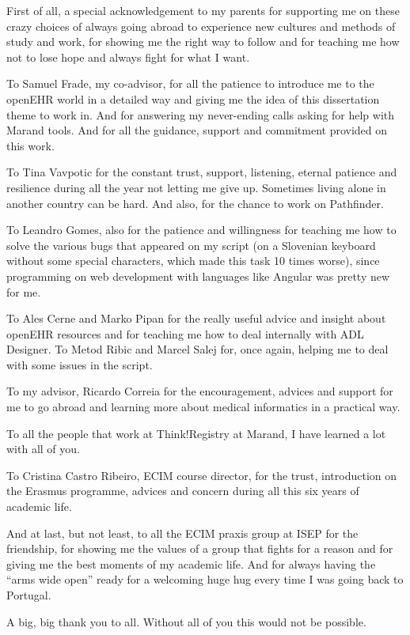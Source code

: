 \documentclass[mim_thesis.tex]{subfiles}
\begin{document}
First of all, a special acknowledgement to my parents for supporting me on these crazy choices of always going abroad to experience new cultures and methods of study and work, for showing me the right way to follow and for teaching me how not to lose hope and always fight for what I want.

To Samuel Frade, my co-advisor, for all the patience to introduce me to the openEHR world in a detailed way and giving me the idea of this dissertation theme to work in. And for answering my never-ending calls asking for help with Marand tools. And for all the guidance, support and commitment provided on this work. 

To Tina Vavpotic for the constant trust, support, listening, eternal patience and resilience during all the year not letting me give up. Sometimes living alone in another country can be hard. And also, for the chance to work on Pathfinder.  

To Leandro Gomes, also for the patience and willingness for teaching me how to solve the various bugs that appeared on my script (on a Slovenian keyboard without some special characters, which made this task 10 times worse), since programming on web development with languages like Angular was pretty new for me.

To Ales Cerne and Marko Pipan for the really useful advice and insight about openEHR resources and for teaching me how to deal internally with ADL Designer. To Metod Ribic and Marcel Salej for, once again, helping me to deal with some issues in the script.

To my advisor, Ricardo Correia for the encouragement, advices and support for me to go abroad and learning more about medical informatics in a practical way.


To all the people that work at Think!Registry at Marand, I have learned a lot with all of you.

To Cristina Castro Ribeiro, ECIM course director, for the trust, introduction on the Erasmus programme, advices and concern during all this six years of academic life. 

And at last, but not least, to all the ECIM praxis group at ISEP for the friendship, for showing me the values of a group that fights for a reason and for giving me the best moments of my academic life. And for always having the “arms wide open” ready for a welcoming huge hug every time I was going back to Portugal. 

A big, big thank you to all. Without all of you this would not be possible.
\end{document}
